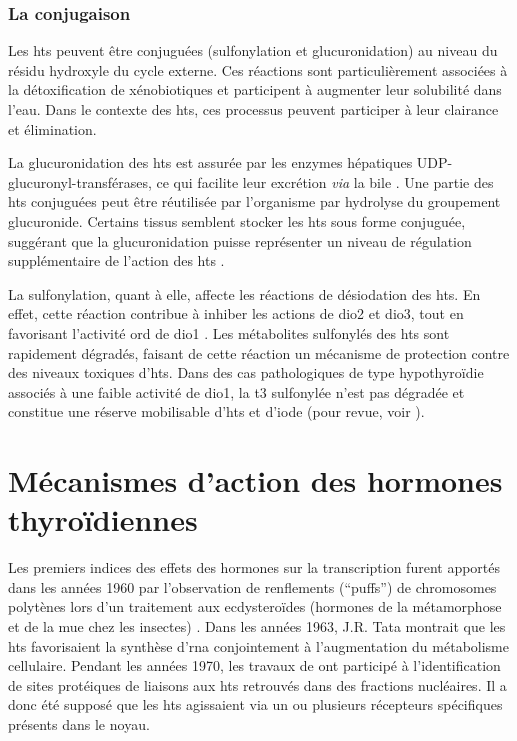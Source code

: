 \documentclass[../main.tex]{subfiles}
\begin{document}
\subsubsection{La conjugaison}
Les \glspl{ht} peuvent être conjuguées (sulfonylation et glucuronidation) au niveau du résidu hydroxyle du cycle externe.
Ces réactions sont particulièrement associées à la détoxification de xénobiotiques et participent à augmenter leur solubilité dans l'eau.
Dans le contexte des \glspl{ht}, ces processus peuvent participer à leur clairance et élimination.
\par
La glucuronidation des \glspl{ht} est assurée par les enzymes hépatiques UDP-glucuronyl-transférases, ce qui facilite leur excrétion \textit{via} la bile \citep{Visser1996}.
Une partie des \glspl{ht} conjuguées peut être réutilisée par l'organisme par hydrolyse du groupement glucuronide.
Certains tissus semblent stocker les \glspl{ht} sous forme conjuguée, suggérant que la glucuronidation puisse représenter un niveau de régulation supplémentaire de l'action des \glspl{ht} \citep{VanderHeide2007}.
\par
La sulfonylation, quant à elle, affecte les réactions de désiodation des \glspl{ht}.
En effet, cette réaction contribue à inhiber les actions de \gls{dio2} et \gls{dio3}, tout en favorisant l'activité \gls{ord} de \gls{dio1} \citep{Visser1990}.
Les métabolites sulfonylés des \glspl{ht} sont rapidement dégradés, faisant de cette réaction un mécanisme de protection contre des niveaux toxiques d'\glspl{ht}.
Dans des cas pathologiques de type hypothyroïdie associés à une faible activité de \gls{dio1}, la \gls{t3} sulfonylée n'est pas dégradée et constitue une réserve mobilisable d'\glspl{ht} et d'iode (pour revue, voir \citealp{Visser1994}).





\section{Mécanismes d'action des hormones thyroïdiennes}

Les premiers indices des effets des hormones sur la transcription furent apportés dans les années 1960 par l'observation de renflements (``puffs'') de chromosomes polytènes lors d'un traitement aux ecdysteroïdes (hormones de la métamorphose et de la mue chez les insectes) \citep{Clever1960}.
Dans les années 1963, J.R. Tata montrait que les \glspl{ht} favorisaient la synthèse d'\gls{rna} conjointement à l'augmentation du métabolisme cellulaire.
Pendant les années 1970, les travaux de \citet{Samuels1973} ont participé à l'identification de sites protéiques de liaisons aux \glspl{ht} retrouvés dans des fractions nucléaires. Il a donc été supposé que les \glspl{ht} agissaient via un ou plusieurs récepteurs spécifiques présents dans le noyau.
\end{document}
